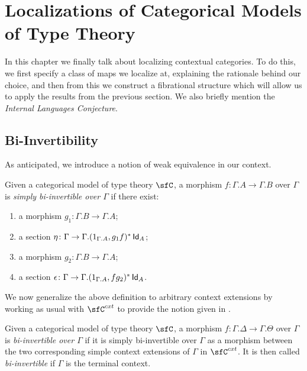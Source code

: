 \chapter{Localizations of Categorical Models of Type Theory}

In this chapter we finally talk about localizing contextual categories. To do
this, we first specify a class of maps we localize at, explaining the rationale
behind our choice, and then from this we construct a fibrational structure which
will allow us to apply the results from the previous section. We also briefly
mention the \emph{Internal Languages Conjecture}.

\section{Bi-Invertibility}

As anticipated, we introduce a notion of weak equivalence in our context.

\begin{defn}
  Given a categorical model of type theory $\sfC$, a morphism
  $f\colon\Gamma.A\rightarrow\Gamma.B$ over $\Gamma$ is \emph{simply
    bi-invertible over $\Gamma$} if there exist:
  \begin{enumerate}
    \item a morphism $g_1\colon\Gamma.B\rightarrow\Gamma.A$;
    \item a section
      $\eta\colon\Gamma\rightarrow\Gamma.(1_{\Gamma.A},g_1f)^*\operatorname{\mathsf{Id}}_{A}$;
    \item a morphism $g_2\colon\Gamma.B\rightarrow\Gamma.A$;
    \item a section
      $\epsilon\colon\Gamma\rightarrow\Gamma.(1_{\Gamma.A},fg_2)^*\operatorname{\mathsf{Id}}_{A}$.
  \end{enumerate}
\end{defn}

We now generalize the above definition to arbitrary context extensions by
working as usual with $\sfC^{cxt}$ to provide the notion given in
\cite[Def.~1.4]{Kap17}.

\begin{defn}
  Given a categorical model of type theory $\sfC$, a morphism
  $f\colon\Gamma.\Delta\rightarrow\Gamma.\Theta$ over $\Gamma$ is
  \emph{bi-invertible over $\Gamma$} if it is simply bi-invertible over $\Gamma$
  as a morphism between the two corresponding simple context extensions of
  $\Gamma$ in $\sfC^{cxt}$. It
  is then called \emph{bi-invertible} if $\Gamma$ is the terminal
  context.
\end{defn}

